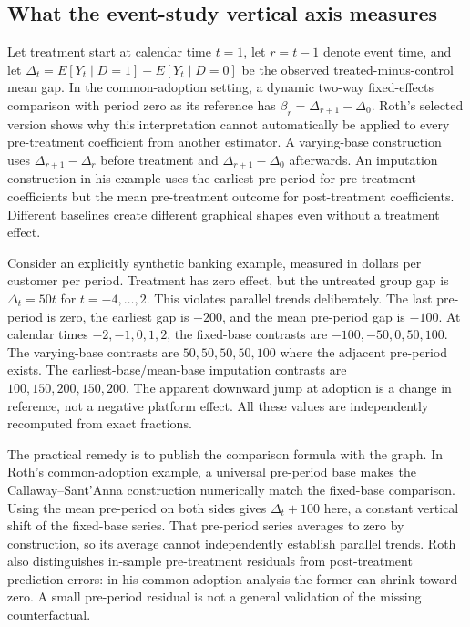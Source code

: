 \subsection{What the event-study vertical axis measures}

Let treatment start at calendar time $t=1$, let $r=t-1$ denote event time, and let
$\Delta_t=E[Y_t\mid D=1]-E[Y_t\mid D=0]$ be the observed treated-minus-control mean gap.
In the common-adoption setting, a dynamic two-way fixed-effects comparison with period zero as its reference has
$\beta_r=\Delta_{r+1}-\Delta_0$. Roth's selected version shows why this interpretation cannot automatically be applied
to every pre-treatment coefficient from another estimator. A varying-base construction uses $\Delta_{r+1}-\Delta_r$
before treatment and $\Delta_{r+1}-\Delta_0$ afterwards. An imputation construction in his example uses the earliest
pre-period for pre-treatment coefficients but the mean pre-treatment outcome for post-treatment coefficients.
Different baselines create different graphical shapes even without a treatment effect.~\citep{exec28_panel_roth}

Consider an explicitly synthetic banking example, measured in dollars per customer per period. Treatment has zero effect,
but the untreated group gap is $\Delta_t=50t$ for $t=-4,\ldots,2$. This violates parallel trends deliberately. The last
pre-period is zero, the earliest gap is $-200$, and the mean pre-period gap is $-100$. At calendar times $-2,-1,0,1,2$,
the fixed-base contrasts are $-100,-50,0,50,100$. The varying-base contrasts are $50,50,50,50,100$ where the adjacent
pre-period exists. The earliest-base/mean-base imputation contrasts are $100,150,200,150,200$.
The apparent downward jump at adoption is a change in reference, not a negative platform effect. All these values
are independently recomputed from exact fractions.~\citep{exec28_panel_reference}

The practical remedy is to publish the comparison formula with the graph. In Roth's common-adoption example, a universal
pre-period base makes the Callaway--Sant'Anna construction numerically match the fixed-base comparison. Using the mean
pre-period on both sides gives $\Delta_t+100$ here, a constant vertical shift of the fixed-base series.
That pre-period series averages to zero by construction, so its average cannot independently establish parallel trends.
Roth also distinguishes in-sample pre-treatment residuals from post-treatment prediction errors: in his common-adoption
analysis the former can shrink toward zero. A small pre-period residual is not a general validation of the missing
counterfactual.~\citep{exec28_panel_roth}

